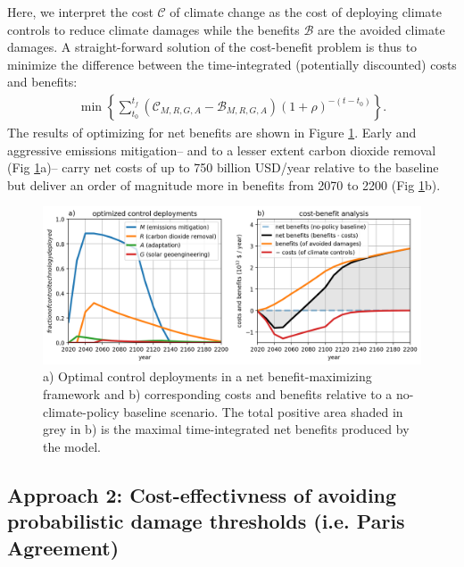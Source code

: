 \documentclass{article}
\begin{document}
Here, we interpret the cost $\mathcal{C}$ of climate change as the cost of deploying climate controls to reduce climate damages while the benefits $\mathcal{B}$ are the avoided climate damages. A straight-forward solution of the cost-benefit problem is thus to minimize the difference between the time-integrated (potentially discounted) costs and benefits:
\begin{gather}
    \min \left\{ \sum_{t_{0}}^{t_{f}} 
    \left(\mathcal{C}_{M, R, G, A} - \mathcal{B}_{M, R, G, A}\right) (1 + \rho)^{-(t-t_{0})} \right\}.
\end{gather}
The results of optimizing for net benefits are shown in Figure \ref{fig.approach1}. Early and aggressive emissions mitigation– and to a lesser extent carbon dioxide removal (Fig \ref{fig.approach1}a)– carry net costs of up to 750 billion USD/year relative to the baseline but deliver an order of magnitude more in benefits from 2070 to 2200 (Fig \ref{fig.approach1}b).

\begin{figure}[htb!]
\noindent\includegraphics[width=1.0\textwidth]{figures/default-benefits_controls_and_benefits.png}
\centering
\caption{a) Optimal control deployments in a net benefit-maximizing framework and b) corresponding costs and benefits relative to a no-climate-policy baseline scenario. The total positive area shaded in grey in b) is the maximal time-integrated net benefits produced by the model.}
\label{fig.approach1}
\end{figure}

\subsection{Approach 2: Cost-effectivness of avoiding probabilistic damage thresholds (i.e. Paris Agreement)}\label{sec.cost-effectivness}
\end{document}
